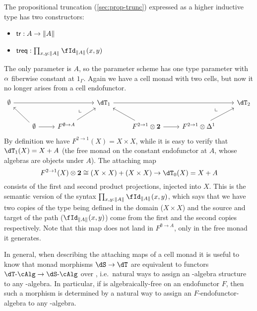 \documentclass{amsart}
\def\alg{\text{-}\cAlg}
\def\tr{\mathsf{tr}}
\def\treq{\mathsf{treq}}
\begin{document}
\begin{eg}
  The propositional truncation (\cref{sec:prop-trunc}) expressed as a higher inductive type has two constructors:
  \begin{itemize}
  \item $\tr:A \to\brck{A}$
  \item $\treq : \prod_{x,y:\brck A} \id[\brck A]{x}{y}$
  \end{itemize}
  The only parameter is $A$, so the parameter scheme has one type parameter with $\alpha$ fiberwise constant at $1_\Gamma$.
  Again we have a cell monad with two cells, but now it no longer arises from a cell endofunctor.
  \[
  \begin{tikzcd}
    \emptyset \ar[rrr] &&& \dT_1 \ar[rrr] &&& \dT_2 \\
    & \emptyset \ar[ul] \ar[r] \ar[urr,phantom,near end,"\llcorner"] & F^{\emptyset\to A} \ar[ur] &
    & F^{2\to 1} \otimes \mathbf{2} \ar[ul] \ar[r] \ar[urr,phantom,near end,"\llcorner"] & F^{2\to 1} \otimes \ivl \ar[ur]
  \end{tikzcd}
  \]
  By definition we have $F^{2\to 1}(X) = X\times X$, while it is easy to verify that $\dT_1(X) = X+A$ (the free monad on the constant endofunctor at $A$, whose algebras are objects under $A$).
  The attaching map
  \[F^{2\to 1}(X)\otimes \mathbf{2} \cong (X\times X) + (X\times X) \to \dT_0(X) = X+A\]
  consists of the first and second product projections, injected into $X$.
  This is the semantic version of the syntax $\prod_{x,y:\brck A} \id[\brck A]{x}{y}$, which says that we have two copies of the type being defined in the domain ($X\times X$) and the source and target of the path ($\id[\brck A]{x}{y}$) come from the first and the second copies respectively.
  Note that this map does not land in $F^{\emptyset\to A}$, only in the free monad it generates.
\end{eg}

In general, when describing the attaching maps of a cell monad it is useful to know that monad morphisms $\dS\to\dT$ are equivalent to functors $\dT\alg\to\dS\alg$ over \sM, i.e.\ natural ways to assign an \dS-algebra structure to any \dT-algebra.
In particular, if \dS is algebraically-free on an endofunctor $F$, then such a morphism is determined by a natural way to assign an $F$-endofunctor-algebra to any \dT-algebra.
\end{document}
